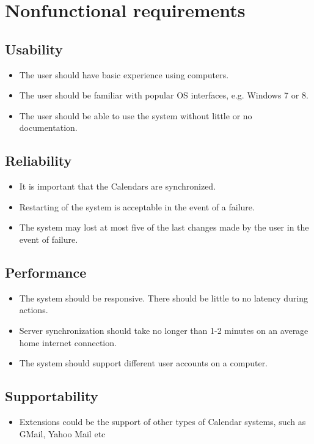 \pagebreak
\section*{Nonfunctional requirements}

\subsection*{Usability}
\begin{itemize}
	\item The user should have basic experience using computers.
	\item The user should be familiar with popular OS interfaces, e.g. Windows 7 or 8.
	\item The user should be able to use the system without little or no documentation.
\end{itemize}


\subsection*{Reliability}
\begin{itemize}
	\item It is important that the Calendars are synchronized.
	\item Restarting of the system is acceptable in the event of a failure.
	\item The system may lost at most five of the last changes made by the user in the event of failure.
\end{itemize}

\subsection*{Performance}
\begin{itemize}
	\item The system should be responsive. There should be little to no latency during actions.
	\item Server synchronization should take no longer than 1-2 minutes on an average home internet connection.
	\item The system should support different user accounts on a computer.
\end{itemize}

\subsection*{Supportability}
\begin{itemize}
	\item Extensions could be the support of other types of Calendar systems, such as GMail, Yahoo Mail etc
\end{itemize}

